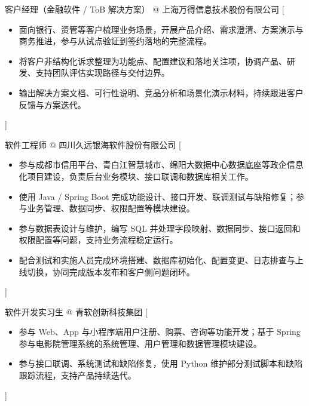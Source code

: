\documentclass[zh]{resume}
\begin{document}
\begin{experiences}

    {客户经理（金融软件 / ToB 解决方案） @ 上海万得信息技术股份有限公司}%
    [\begin{itemize}
      \item 面向银行、资管等客户梳理业务场景，开展产品介绍、需求澄清、方案演示与商务推进，参与从试点验证到签约落地的完整流程。
      \item 将客户非结构化诉求整理为功能点、配置建议和落地关注项，协调产品、研发、支持团队评估实现路径与交付边界。
      \item 输出解决方案文档、可行性说明、竞品分析和场景化演示材料，持续跟进客户反馈与方案迭代。
    \end{itemize}]

  \separator{0.5ex}

    {软件工程师 @ 四川久远银海软件股份有限公司}%
    [\begin{itemize}
      \item 参与成都市信用平台、青白江智慧城市、绵阳大数据中心数据底座等政企信息化项目建设，负责后台业务模块、接口联调和数据库相关工作。
      \item 使用 Java / Spring Boot 完成功能设计、接口开发、联调测试与缺陷修复；参与业务管理、数据同步、权限配置等模块建设。
      \item 参与数据表设计与维护，编写 SQL 并处理字段映射、数据同步、接口返回和权限配置等问题，支持业务流程稳定运行。
      \item 配合测试和实施人员完成环境搭建、数据库初始化、配置变更、日志排查与上线切换，协同完成版本发布和客户侧问题闭环。
    \end{itemize}]

  \separator{0.5ex}

    {软件开发实习生 @ 青软创新科技集团}%
    [\begin{itemize}
      \item 参与 Web、App 与小程序端用户注册、购票、咨询等功能开发；基于 Spring 参与电影院管理系统的系统管理、用户管理和数据管理模块建设。
      \item 参与接口联调、系统测试和缺陷修复，使用 Python 维护部分测试脚本和缺陷跟踪流程，支持产品持续迭代。
    \end{itemize}]

\end{experiences}
\end{document}

